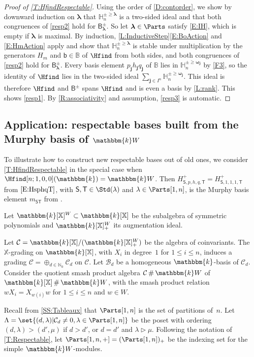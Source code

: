 \documentclass[a4paper,11pt]{amsart}
\newcommand\blam{{\boldsymbol\lambda}}
\newcommand\bom{{\boldsymbol\omega}}
\newcommand\cB{\mathcal{B}}
\newcommand\bj{\mathbf{j}}
\numberwithin{equation}{subsection}
\theoremstyle{definition}
\theoremstyle{theorem}
\theoremstyle{remark}
\newcommand\HH{\mathbb{H}}
\newcommand\Sym{W}
\newcommand\Basis[1][\pm]{\mathsf{B}^{#1}}
\newcommand\bb{\mathsf{b}}
\newcommand\bS{{\mathsf{S}}}
\newcommand\bT{{\mathsf{T}}}
\newcommand\N{\mathbb{N}}
\newcommand\X{\mathbb{X}}
\newcommand\kk{\mathbbm{k}}
\newcommand{\Bo}{\mathbb{B}}
\DeclareMathOperator\Smash{\#}
\begin{document}
\begin{proof}[Proof of \autoref{T:HfindRespectable}]
  Using the order of \autoref{D:contorder}, we show by downward induction on $\blam$ that $\HH^{\pm\ge\blam}_n$ is a two-sided ideal and that both congruences of
  \autoref{resp2} hold for $\Basis_\blam$. So let $\blam\in\Parts$ satisfy \autoref{E:IH}, which is
  empty if $\blam$ is maximal. By induction, \autoref{L:InductiveStep}\autoref{E:BoAction} and
  \autoref{E:HmAction} apply and show that  $\HH^{\pm\ge\blam}_n$ is stable under multiplication by the generators
  $H_m$ and $\bb\in\Bo$ of $\Hfind$ from both sides, and both congruences of \autoref{resp2} hold for
  $\Basis_\blam$. Every basis element
  $p_\bj h_\bj q_\bj$ of $\Bo$ lies in $\HH^{\pm\ge\bom_\bj}_n$ by \autoref{F3}, so the
  identity of $\Hfind$ lies in the two-sided ideal $\sum_{\bj\in I^n}\HH^{\pm\ge\bom_\bj}_n$. This ideal
  is therefore $\Hfind$ and $\Basis$ spans $\Hfind$ and  is even a basis by \autoref{L:rank}. This shows
  \autoref{resp1}. By \autoref{R:associativity} and assumption, \autoref{resp3} is automatic.
  \end{proof}

  \subsection{Application: respectable bases built from the Murphy basis of $\kk W$}
To illustrate how to construct new respectable bases out of old ones, we
consider  \autoref{T:HfindRespectable} in the special case when $\Hfind[n;1,0,0](\kk)=\kk W$. Then
$H^+_{\bS,p,h,q,\bT}=H^+_{\bS,1,1,1,\bT}$ from $\eqref{E:HsphqT}$, with
$\bS,\bT\in\Std(\lambda)$ and $\lambda\in\Parts[1,n]$, is the Murphy basis
element $m_{\bS\bT}$ from \cite[Theorem~4.17]{Murphy:basis}.

Let $\kk[\X]^\Sym\subset \kk[\X]$  be the subalgebra of symmetric polynomials and  $\kk[\X]^\Sym_+$  its augmentation ideal.

 Let $\mathcal{C}=\kk[\X]/(\kk[\X]^\Sym_+)$ be the algebra of
 coinvariants. The $\X$-grading on $\kk[\X]$, with $X_i$ in degree~$1$
 for $1\leq i\leq n$, induces a grading
 $\mathcal{C}=\oplus_{d\in\N_0}\mathcal{C}_d$ on $\mathcal{C}$. Let
 $\cB_d$ be a homogeneous $\kk$-basis of $\mathcal{C}_d$.  Consider the
 quotient smash product algebra $\mathcal{C}\Smash\kk\Sym$ of
 $\kk[\X]\Smash\kk\Sym$, with the  smash product relation
 $wX_i=X_{w(i)}w$ for $1\leq i\leq n$ and $w\in\Sym$.

Recall from \autoref{SS:Tableaux} that $\Parts[1,n]$ is the set of
partitions of~$n$. Let $\Lambda=\set{(d,\lambda)|\mathcal{C}_d\neq0,
\lambda\in \Parts[1,n]}$ be the poset with ordering
$(d,\lambda)>(d',\mu)$ if $d>d'$, or $d=d'$ and
$\lambda\vartriangleright\mu$. Following the notation of
\autoref{T:Respectable}, let $\Parts[1,n,+]=(\Parts[1,n])_+$ be the
indexing set for the simple $\kk W$-modules.
\end{document}
